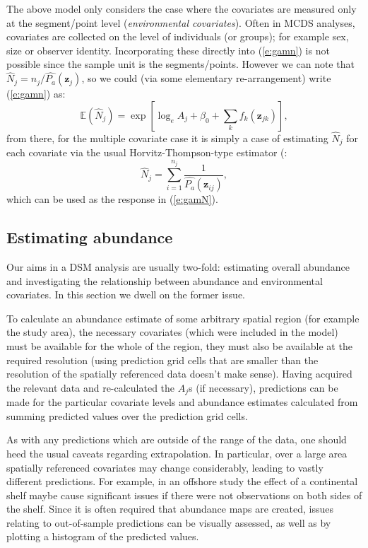\documentclass[a4paper,12pt]{article}
\begin{document}
The above model only considers the case where the covariates are measured only at the segment/point level (\textit{environmental covariates}). Often in MCDS analyses, covariates are collected on the level of individuals (or groups); for example sex, size or observer identity. Incorporating these directly into (\ref{e:gamn}) is not possible since the sample unit is the segments/points. However we can note that $\hat{N}_j = n_j/\hat{P_a}(\mathbf{z}_j)$, so we could (via some elementary re-arrangement) write (\ref{e:gamn}) as:
\begin{equation}
\mathbb{E}(\hat{N}_j) = \exp\left[ \log_e A_j + \beta_0 + \sum_k f_k\left(\bm{z}_{jk}\right) \right],
\label{e:gamN}
\end{equation}
from there, for the multiple covariate case it is simply a case of estimating $\hat{N}_j$ for each covariate via the usual Horvitz-Thompson-type estimator (\cite{Thompson:2002wi}:
\begin{equation*}
\hat{N}_j = \sum_{i=1}^{n_j} \frac{1}{\hat{P_a}(\mathbf{z}_{ij})},
\end{equation*}
which can be used as the response in (\ref{e:gamN}). 

\subsection*{Estimating abundance}

Our aims in a DSM analysis are usually two-fold: estimating overall abundance and investigating the relationship between abundance and environmental covariates. In this section we dwell on the former issue.

To calculate an abundance estimate of some arbitrary spatial region (for example the study area), the necessary covariates (which were included in the model) must be available for the whole of the region, they must also be available at the required resolution (using prediction grid cells that are smaller than the resolution of the spatially referenced data doesn't make sense). Having acquired the relevant data and re-calculated the $A_j$s (if necessary), predictions can be made for the particular covariate levels and abundance estimates calculated from summing predicted values over the prediction grid cells. 

As with any predictions which are outside of the range of the data, one should heed the usual caveats regarding extrapolation. In particular, over a large area spatially referenced covariates may change considerably, leading to vastly different predictions. For example, in an offshore study the effect of a continental shelf maybe cause significant issues if there were not observations on both sides of the shelf. Since it is often required that abundance maps are created, issues relating to out-of-sample predictions can be visually assessed, as well as by plotting a histogram of the predicted values.
\end{document}
